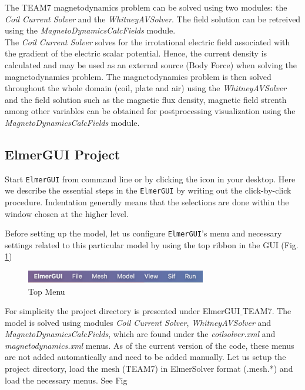 The TEAM7 magnetodynamics problem can be solved using two modules: the \textit{Coil Current Solver} and the \textit{WhitneyAVSolver}.  The field solution can be retreived using the \textit{MagnetoDynamicsCalcFields} module.\\

The \textit{Coil Current Solver} solves for the irrotational electric field associated with the gradient of the electric scalar potential.  Hence,  the current density is calculated and may be used as an external source (Body Force) when solving the magnetodynamics problem.  The magnetodynamics problem is then solved throughout the whole domain (coil,  plate and air) using the  \textit{WhitneyAVSolver} and the field solution such as the magnetic flux density,  magnetic field strenth among other variables can be obtained for postprocessing visualization using the \textit{MagnetoDynamicsCalcFields} module.



\subsection*{ElmerGUI Project}

Start \texttt{ElmerGUI} from command line or by clicking the icon in your desktop. Here we describe the essential steps in the \texttt{ElmerGUI} by writing out the click-by-click procedure.  Indentation generally means that the selections are done within the window chosen at the higher level. 

Before setting up the model,  let us configure \texttt{ElmerGUI}'s menu and necessary settings related to this particular model by using the top ribbon in the GUI (Fig. \ref{fg:ribbon})

\begin{figure}[H]
\centering
\includegraphics[width=0.7\textwidth]{figures/ribbon.png}
\caption{Top Menu}\label{fg:ribbon}
\end{figure}  

For simplicity the project directory is presented under ElmerGUI$\_$TEAM7. The model is solved using modules \textit{Coil Current Solver}, \textit{WhitneyAVSolver} and \textit{MagnetoDynamicsCalcFields},  which are found under the \textit{coilsolver.xml} and \textit{magnetodynamics.xml} menus.  As of the current version of the code,  these menus are not added automatically and need to be added manually.   Let us setup the project directory,  load the mesh (TEAM7) in ElmerSolver format (.mesh.*) and load the necessary menus.  See Fig 



